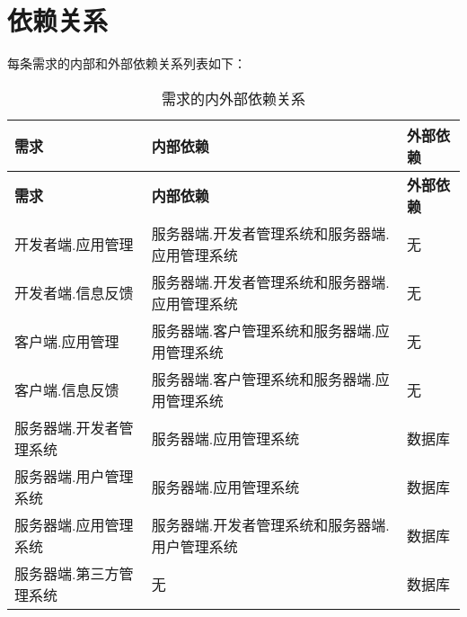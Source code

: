 \chapter{依赖关系}
每条需求的内部和外部依赖关系列表如下：

\begin{longtable}{|p{6cm}|p{6cm}|p{6cm}}
\caption{需求的内外部依赖关系}\label{tab:concrete_dev_sys_output_valid} \\
\hline
\textbf{需求} & \textbf{内部依赖} & \textbf{外部依赖}\\
\hline
\endfirsthead
\hline
\textbf{需求} & \textbf{内部依赖} & \textbf{外部依赖}\\
\hline
\endhead
\hline 
\endfoot
\hline
\endlastfoot
开发者端.应用管理 & 服务器端.开发者管理系统和服务器端.应用管理系统 & 无\\
开发者端.信息反馈 & 服务器端.开发者管理系统和服务器端.应用管理系统 & 无\\
客户端.应用管理 & 服务器端.客户管理系统和服务器端.应用管理系统 & 无\\
客户端.信息反馈 &
服务器端.客户管理系统和服务器端.应用管理系统 & 无\\
服务器端.开发者管理系统 & 服务器端.应用管理系统 & 数据库\\
服务器端.用户管理系统 & 服务器端.应用管理系统 & 数据库\\
服务器端.应用管理系统 & 服务器端.开发者管理系统和服务器端.用户管理系统 & 数据库\\ 
服务器端.第三方管理系统 & 无 & 数据库\\ 

\end{longtable}